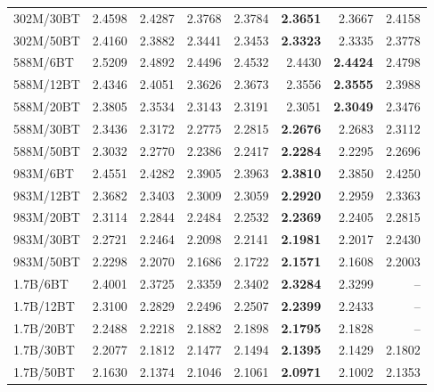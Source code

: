 \begin{table}[t]
{\begin{tabular}{lrrrrrrr}
    302M/30BT & 2.4598 & 2.4287 & 2.3768 & 2.3784 & \textbf{2.3651} & 2.3667 & 2.4158 \\
    302M/50BT & 2.4160 & 2.3882 & 2.3441 & 2.3453 & \textbf{2.3323} & 2.3335 & 2.3778 \\
    \midrule
    588M/6BT & 2.5209 & 2.4892 & 2.4496 & 2.4532 & 2.4430 & \textbf{2.4424} & 2.4798 \\
    588M/12BT & 2.4346 & 2.4051 & 2.3626 & 2.3673 & 2.3556 & \textbf{2.3555} & 2.3988 \\
    588M/20BT & 2.3805 & 2.3534 & 2.3143 & 2.3191 & 2.3051 & \textbf{2.3049} & 2.3476 \\
    588M/30BT & 2.3436 & 2.3172 & 2.2775 & 2.2815 & \textbf{2.2676} & 2.2683 & 2.3112 \\
    588M/50BT & 2.3032 & 2.2770 & 2.2386 & 2.2417 & \textbf{2.2284} & 2.2295 & 2.2696 \\
    \midrule
    983M/6BT & 2.4551 & 2.4282 & 2.3905 & 2.3963 & \textbf{2.3810} & 2.3850 & 2.4250 \\
    983M/12BT & 2.3682 & 2.3403 & 2.3009 & 2.3059 & \textbf{2.2920} & 2.2959 & 2.3363 \\
    983M/20BT & 2.3114 & 2.2844 & 2.2484 & 2.2532 & \textbf{2.2369} & 2.2405 & 2.2815 \\
    983M/30BT & 2.2721 & 2.2464 & 2.2098 & 2.2141 & \textbf{2.1981} & 2.2017 & 2.2430 \\
    983M/50BT & 2.2298 & 2.2070 & 2.1686 & 2.1722 & \textbf{2.1571} & 2.1608 & 2.2003 \\
    \midrule
    1.7B/6BT & 2.4001 & 2.3725 & 2.3359 & 2.3402 & \textbf{2.3284} & 2.3299 & -- \\
    1.7B/12BT & 2.3100 & 2.2829 & 2.2496 & 2.2507 & \textbf{2.2399} & 2.2433 & -- \\
    1.7B/20BT & 2.2488 & 2.2218 & 2.1882 & 2.1898 & \textbf{2.1795} & 2.1828 & -- \\
    1.7B/30BT & 2.2077 & 2.1812 & 2.1477 & 2.1494 & \textbf{2.1395} & 2.1429 & 2.1802 \\
    1.7B/50BT & 2.1630 & 2.1374 & 2.1046 & 2.1061 & \textbf{2.0971} & 2.1002 & 2.1353 \\
    \bottomrule
  \end{tabular}%
  }
\end{table}
